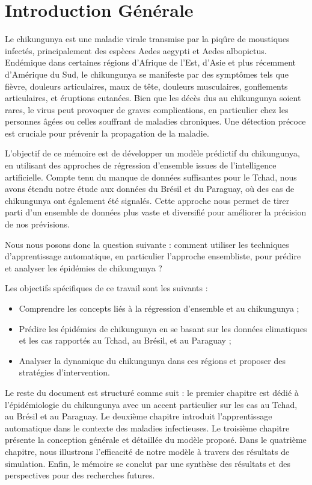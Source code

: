 \chapter*{Introduction Générale}

Le chikungunya est une maladie virale transmise par la piqûre de moustiques infectés, principalement des espèces Aedes aegypti et Aedes albopictus. Endémique dans certaines régions d'Afrique de l'Est, d'Asie et plus récemment d'Amérique du Sud, le chikungunya se manifeste par des symptômes tels que fièvre, douleurs articulaires, maux de tête, douleurs musculaires, gonflements articulaires, et éruptions cutanées. Bien que les décès dus au chikungunya soient rares, le virus peut provoquer de graves complications, en particulier chez les personnes âgées ou celles souffrant de maladies chroniques. Une détection précoce est cruciale pour prévenir la propagation de la maladie.

L'objectif de ce mémoire est de développer un modèle prédictif du chikungunya, en utilisant des approches de régression d'ensemble issues de l'intelligence artificielle. Compte tenu du manque de données suffisantes pour le Tchad, nous avons étendu notre étude aux données du Brésil et du Paraguay, où des cas de chikungunya ont également été signalés. Cette approche nous permet de tirer parti d'un ensemble de données plus vaste et diversifié pour améliorer la précision de nos prévisions.

Nous nous posons donc la question suivante : comment utiliser les techniques d'apprentissage automatique, en particulier l'approche ensembliste, pour prédire et analyser les épidémies de chikungunya ?

Les objectifs spécifiques de ce travail sont les suivants :
\begin{itemize}
	\item Comprendre les concepts liés à la régression d'ensemble et au chikungunya ;
	\item Prédire les épidémies de chikungunya en se basant sur les données climatiques et les cas rapportés au Tchad, au Brésil, et au Paraguay ;
	\item Analyser la dynamique du chikungunya dans ces régions et proposer des stratégies d'intervention.
\end{itemize}

Le reste du document est structuré comme suit : le premier chapitre est dédié à l'épidémiologie du chikungunya avec un accent particulier sur les cas au Tchad, au Brésil et au Paraguay. Le deuxième chapitre introduit l'apprentissage automatique dans le contexte des maladies infectieuses. Le troisième chapitre présente la conception générale et détaillée du modèle proposé. Dans le quatrième chapitre, nous illustrons l'efficacité de notre modèle à travers des résultats de simulation. Enfin, le mémoire se conclut par une synthèse des résultats et des perspectives pour des recherches futures.

